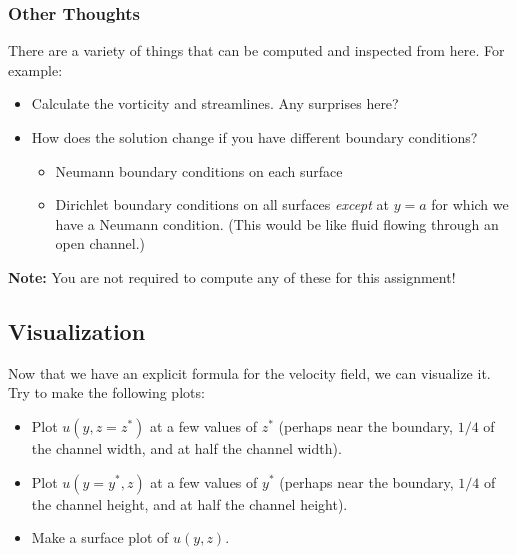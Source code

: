 \documentclass[11pt]{article}
\begin{document}
    \subsubsection{Other Thoughts}
    There are a variety of things that can be computed and inspected from here.  For example:
    \begin{itemize}
      \item Calculate the vorticity and streamlines.  Any surprises here?
      \item How does the solution change if you have different boundary conditions?
        \begin{itemize}
          \item Neumann boundary conditions on each surface 
          \item Dirichlet boundary conditions on all surfaces \emph{except} at $y=a$ for which we have a Neumann condition. (This would be like fluid flowing through an open channel.)
        \end{itemize}
    \end{itemize}
    \textbf{Note:}  You are not required to compute any of these for this assignment!
    
    \begin{solution}
        
    \end{solution}

  \subsection{Visualization}
  Now that we have an explicit formula for the velocity field, we can visualize it.  Try to make the following plots:
  \begin{itemize}
    \item Plot $u\left(y,z=z^{*}\right)$ at a few values of $z^{*}$ (perhaps near the boundary, $1/4$ of the channel width, and
at half the channel width).
    \item Plot $u\left(y=y^{*},z\right)$ at a few values of $y^{*}$ (perhaps near the boundary, $1/4$ of the channel height, and
at half the channel height).
    \item Make a surface plot of $u\left(y,z\right)$.
  \end{itemize}
  
    \begin{solution}
        
    \end{solution}
    \pagebreak
\end{document}
